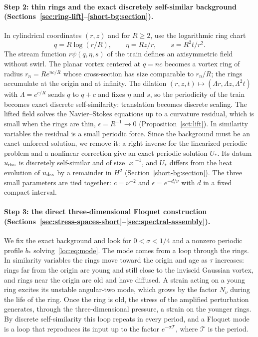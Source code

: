 \documentclass[11pt]{article}
\numberwithin{equation}{section}
\theoremstyle{definition}
\theoremstyle{remark}
\theoremstyle{plain}
\begin{document}
\paragraph{Step 2: thin rings and the exact discretely self-similar
background (Sections~\ref{sec:ring-lift}--\ref{short-bg:section}).}
In cylindrical coordinates $(r,z)$ and for $R\ge2$, use the
logarithmic ring chart
\[
 q=R\log(r/R),\qquad \eta=Rz/r,\qquad s=R^2t/r^2.
\]
The stream function $r\psi(q,\eta,s)$ of the train defines an
axisymmetric field without swirl. The planar vortex centered at $q=nc$
becomes a vortex ring of radius $r_n=Re^{nc/R}$ whose cross-section has
size comparable to $r_n/R$; the rings accumulate at the origin and at
infinity. The dilation $(r,z,t)\mapsto(\Lambda r,\Lambda z,\Lambda^2t)$
with $\Lambda=e^{c/R}$ sends $q$ to $q+c$ and fixes $\eta$ and $s$, so
the periodicity of the train becomes exact discrete self-similarity:
translation becomes discrete scaling. The lifted field solves the
Navier--Stokes equations up to a curvature residual, which is small when
the rings are thin, $\epsilon=R^{-1}\to0$
(Proposition~\ref{sct:lift}). In similarity variables the residual is a
small periodic force. Since the background must be an exact unforced
solution, we remove it: a right inverse for the linearized periodic
problem and a nonlinear correction give an exact periodic solution
$U_*$. Its datum $u_{\rm dss}$ is discretely self-similar and of size
$|x|^{-1}$, and $U_*$ differs from the heat evolution of $u_{\rm dss}$
by a remainder in $H^2$ (Section~\ref{short-bg:section}). The three
small parameters are tied together: $c=\nu^{-2}$ and $\epsilon=e^{-d/\nu}$
with $d$ in a fixed compact interval.

\paragraph{Step 3: the direct three-dimensional Floquet construction
(Sections~\ref{sec:stress-spaces-short}--\ref{sec:spectral-assembly}).}
We fix the exact background and look for $0<\sigma<1/4$ and a nonzero
periodic profile $b_*$ solving~\eqref{loc:eq:mode}. The mode comes from
a loop through the rings. In similarity variables the rings move toward
the origin and age as $\tau$ increases: rings far from the origin are
young and still close to the inviscid Gaussian vortex, and rings near
the origin are old and have diffused. A strain acting on a young ring
excites its unstable angular-two mode, which grows by the factor
$N_\nu$ during the life of the ring. Once the ring is old, the stress of
the amplified perturbation generates, through the three-dimensional
pressure, a strain on the younger rings. By discrete self-similarity this
loop repeats in every period, and a Floquet mode is a loop that
reproduces its input up to the factor $e^{-\sigma\mathcal T}$, where
$\mathcal T$ is the period.
\end{document}
